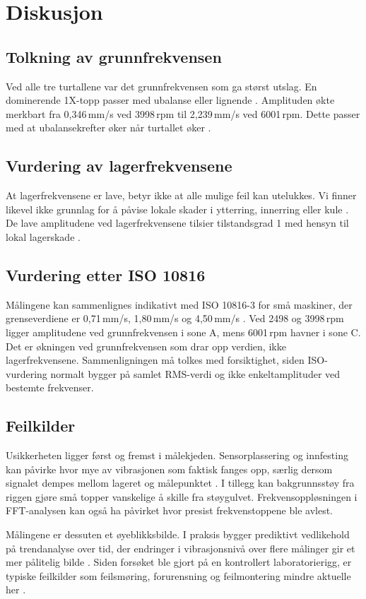 \section{Diskusjon}

\subsection{Tolkning av grunnfrekvensen}
Ved alle tre turtallene var det grunnfrekvensen som ga størst utslag. En dominerende 1X-topp passer med ubalanse eller lignende \parencite{vibrasjon2}. Amplituden økte merkbart fra 0{,}346\,mm/s ved 3998\,rpm til 2{,}239\,mm/s ved 6001\,rpm. Dette passer med at ubalansekrefter øker når turtallet øker \parencite{vibrasjon2}.

\subsection{Vurdering av lagerfrekvensene}
At lagerfrekvensene er lave, betyr ikke at alle mulige feil kan utelukkes. Vi finner likevel ikke grunnlag for å påvise lokale skader i ytterring, innerring eller kule \parencite{vibrasjon3}. De lave amplitudene ved lagerfrekvensene tilsier tilstandsgrad 1 med hensyn til lokal lagerskade \parencite{tbv2}.

\subsection{Vurdering etter ISO 10816}
Målingene kan sammenlignes indikativt med ISO 10816-3 for små maskiner, der grenseverdiene er 0{,}71\,mm/s, 1{,}80\,mm/s og 4{,}50\,mm/s \parencite{iso10816, vibrasjon1}. Ved 2498 og 3998\,rpm ligger amplitudene ved grunnfrekvensen i sone A, mens 6001\,rpm havner i sone C. Det er økningen ved grunnfrekvensen som drar opp verdien, ikke lagerfrekvensene. Sammenligningen må tolkes med forsiktighet, siden ISO-vurdering normalt bygger på samlet RMS-verdi og ikke enkeltamplituder ved bestemte frekvenser.

\subsection{Feilkilder}
Usikkerheten ligger først og fremst i målekjeden. Sensorplassering og innfesting kan påvirke hvor mye av vibrasjonen som faktisk fanges opp, særlig dersom signalet dempes mellom lageret og målepunktet \parencite{tbv2}. I tillegg kan bakgrunnsstøy fra riggen gjøre små topper vanskelige å skille fra støygulvet. Frekvensoppløsningen i FFT-analysen kan også ha påvirket hvor presist frekvenstoppene ble avlest.

Målingene er dessuten et øyeblikksbilde. I praksis bygger prediktivt vedlikehold på trendanalyse over tid, der endringer i vibrasjonsnivå over flere målinger gir et mer pålitelig bilde \parencite{vibrasjon2, tbv2}. Siden forsøket ble gjort på en kontrollert laboratorierigg, er typiske feilkilder som feilsmøring, forurensning og feilmontering mindre aktuelle her \parencite{vibrasjon3}.

